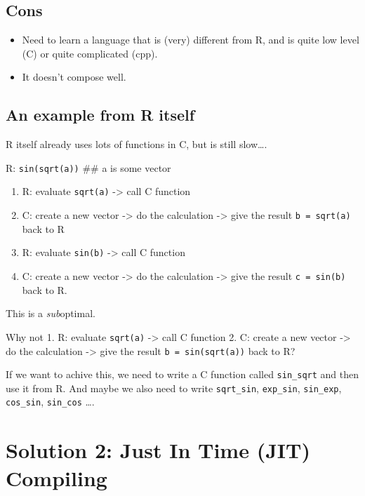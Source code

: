 \documentclass[11pt]{article}
\providecommand{\tightlist}{%
      \setlength{\itemsep}{0pt}\setlength{\parskip}{0pt}}
\begin{document}
\hypertarget{cons}{%
\subsection{Cons}\label{cons}}

\begin{itemize}
\item
  Need to learn a language that is (very) different from R, and is quite
  low level (C) or quite complicated (cpp).
\item
  It doesn't compose well.
\end{itemize}

    \hypertarget{an-example-from-r-itself}{%
\subsection{An example from R itself}\label{an-example-from-r-itself}}

R itself already uses lots of functions in C, but is still slow\ldots{}.

R: \texttt{sin(sqrt(a))} \#\# a is some vector

\begin{enumerate}
\def\labelenumi{\arabic{enumi}.}
\tightlist
\item
  R: evaluate \texttt{sqrt(a)} -\textgreater{} call C function
\item
  C: create a new vector -\textgreater{} do the calculation
  -\textgreater{} give the result \texttt{b\ =\ sqrt(a)} back to R
\item
  R: evaluate \texttt{sin(b)} -\textgreater{} call C function
\item
  C: create a new vector -\textgreater{} do the calculation
  -\textgreater{} give the result \texttt{c\ =\ sin(b)} back to R.
\end{enumerate}

    This is a \emph{sub}optimal.

Why not 1. R: evaluate \texttt{sqrt(a)} -\textgreater{} call C function
2. C: create a new vector -\textgreater{} do the calculation
-\textgreater{} give the result \texttt{b\ =\ sin(sqrt(a))} back to R?

If we want to achive this, we need to write a C function called
\texttt{sin\_sqrt} and then use it from R. And maybe we also need to
write \texttt{sqrt\_sin}, \texttt{exp\_sin}, \texttt{sin\_exp},
\texttt{cos\_sin}, \texttt{sin\_cos} \ldots{}.

    \hypertarget{solution-2-just-in-time-jit-compiling}{%
\section{Solution 2: Just In Time (JIT)
Compiling}\label{solution-2-just-in-time-jit-compiling}}
\end{document}
